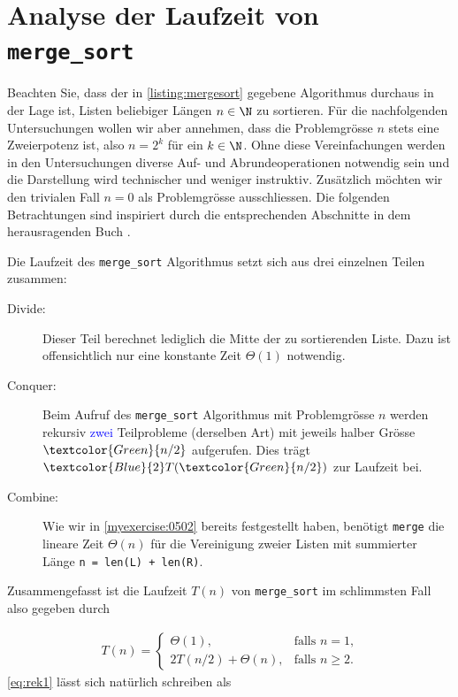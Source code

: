 \section{Analyse der Laufzeit von \lstinline{merge_sort}}
Beachten Sie, dass der in \cref{listing:mergesort} gegebene Algorithmus durchaus in der Lage ist, Listen beliebiger Längen $n\in\N$ zu sortieren. Für die nachfolgenden Untersuchungen wollen wir aber annehmen, dass die Problemgrösse $n$ stets eine Zweierpotenz ist, also $n = 2^k$ für ein $k\in\N$. Ohne diese Vereinfachungen werden in den Untersuchungen diverse Auf- und Abrundeoperationen notwendig sein und die Darstellung wird technischer und weniger instruktiv. Zusätzlich möchten wir den trivialen Fall $n = 0$ als Problemgrösse ausschliessen. Die folgenden Betrachtungen sind inspiriert durch die entsprechenden Abschnitte in dem herausragenden Buch \cite{IntroductionAlgo}.

Die Laufzeit des \lstinline{merge_sort} Algorithmus setzt sich aus drei einzelnen Teilen zusammen:
\begin{description}
	\item[Divide:] Dieser Teil berechnet lediglich die Mitte der zu sortierenden Liste. Dazu ist offensichtlich nur eine konstante Zeit $\Theta(1)$ notwendig.
	\item[Conquer:] Beim Aufruf des \lstinline{merge_sort} Algorithmus mit Problemgrösse $n$ werden rekursiv \textcolor{Blue}{zwei} Teilprobleme (derselben Art) mit jeweils halber Grösse $\textcolor{Green}{n/2}$ aufgerufen. Dies trägt $\textcolor{Blue}{2}T(\textcolor{Green}{n/2})$ zur Laufzeit bei.
	\item[Combine:] Wie wir in \cref{myexercise:0502} bereits festgestellt haben, benötigt \lstinline{merge} die lineare Zeit $\Theta(n)$ für die Vereinigung zweier Listen mit summierter Länge \lstinline|n = len(L) + len(R)|.
\end{description}
Zusammengefasst ist die Laufzeit $T(n)$ von \lstinline{merge_sort} im schlimmsten Fall also gegeben durch

\begin{align}\label{eq:rek1}
	T(n) =
	\begin{cases}
		\Theta(1),           & \text{falls $n = 1$,}   \\
		2T(n/2) + \Theta(n), & \text{falls $n\geq 2$}.
	\end{cases}
\end{align}
\cref{eq:rek1} lässt sich natürlich schreiben als

